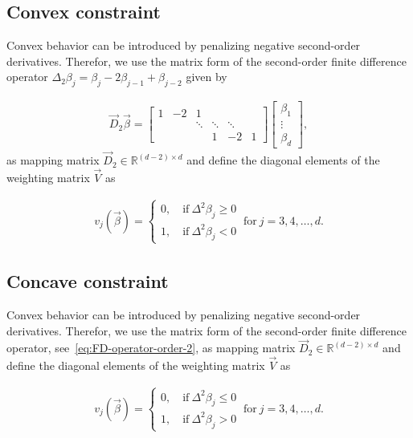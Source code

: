 \documentclass[10pt,a4paper]{report}
\begin{document}
\subsection{Convex constraint} \label{subsec:ConvC}

Convex behavior can be introduced by penalizing negative second-order derivatives. Therefor, we  use the matrix form of the second-order finite difference operator $\Delta_2 \beta_j = \beta_j - 2\beta_{j-1} + \beta_{j-2}$ given by

\begin{align} \label{eq:FD-operator-order-2}
	\vec{D}_2 \vec{\beta} = 
	\begin{bmatrix} 
		1& -2& 1& &    \\  
		&  & \ddots & \ddots  & \ddots \\ 
		& & & 1 & -2 & 1 
	\end{bmatrix} \begin{bmatrix}
		\beta_1 \\
		\vdots \\
		\beta_d
	\end{bmatrix},
\end{align}
%
as mapping matrix $\vec{D}_2 \in \mathbb{R}^{(d-2)\times d}$ and define the diagonal elements of the weighting matrix $\vec{V}$ as

\begin{align} \label{eq:weighting-matrix-conv-diagonal}
	v_j(\vec{\beta}) = \begin{cases}
		0, \quad \text{if} \ \Delta^2\beta_j \ge 0 \\ 
		1, \quad \text{if} \ \Delta^2\beta_j < 0
	\end{cases}	\ \text{for} \ j=3,4, \dots, d.
\end{align}

\subsection{Concave constraint} \label{subsec:ConcC}

Convex behavior can be introduced by penalizing negative second-order derivatives. Therefor, we  use the matrix form of the second-order finite difference operator, see~\ref{eq:FD-operator-order-2}, as mapping matrix $\vec{D}_2 \in \mathbb{R}^{(d-2)\times d}$ and define the diagonal elements of the weighting matrix $\vec{V}$ as

\begin{align} \label{eq:weighting-matrix-conc-diagonal}
	v_j(\vec{\beta}) = \begin{cases}
		0, \quad \text{if} \ \Delta^2\beta_j \le 0 \\ 
		1, \quad \text{if} \ \Delta^2\beta_j > 0
	\end{cases}	\ \text{for} \ j=3,4, \dots, d.
\end{align}
\end{document}
